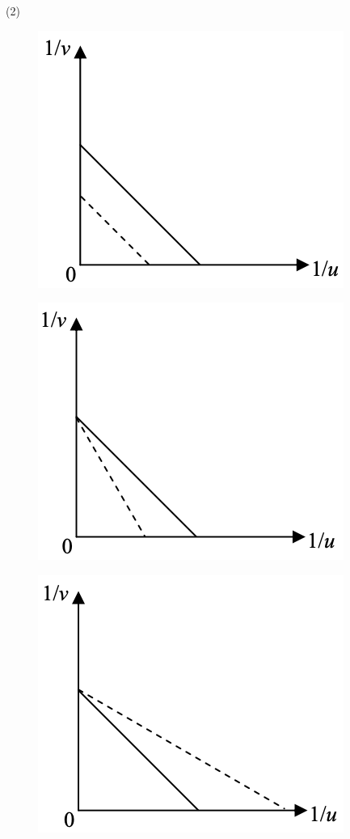 \documentclass[beamer=true]{standalone}
\begin{document}
\begin{eg}
    \begin{tasks}[item-indent=2em,label-offset=0em,before-skip=.3em,after-item-skip=.5em](2)
        \task
        \begin{figure}
            \centering
            \includegraphics[width=0.7\linewidth]{../../assets/dun982393.png}
        \end{figure}
        \task
        \begin{figure}
            \centering
            \includegraphics[width=0.7\linewidth]{../../assets/ddewcwcwcwcww.png}
        \end{figure}
        \task
        \begin{figure}
            \centering
            \includegraphics[width=0.7\linewidth]{../../assets/ewwewefwfqweqf.png}

\end{figure}
\end{tasks}
\end{eg}
\end{document}
